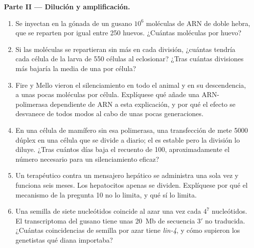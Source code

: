 \begin{problem}
\medskip
\noindent\textbf{Parte II --- Dilución y amplificación.}
\begin{enumerate}[resume]
  \item Se inyectan en la gónada de un gusano $10^{6}$ moléculas de ARN
        de doble hebra, que se reparten por igual entre \num{250}
        huevos. ¿Cuántas moléculas por huevo?
  \item Si las moléculas se repartieran sin más en cada división,
        ¿cuántas tendría cada célula de la larva de \num{550} células al
        eclosionar? ¿Tras cuántas divisiones más bajaría la media de una
        por célula?
  \item Fire y Mello vieron el silenciamiento en todo el animal y en su
        descendencia, a unas pocas moléculas por célula. Explíquese qué
        añade una ARN-polimerasa dependiente de ARN a esta explicación, y
        por qué el efecto se desvanece de todos modos al cabo de unas
        pocas generaciones.
  \item En una célula de mamífero sin esa polimerasa, una transfección
        de  mete \num{5000} dúplex en una célula que se divide a
        diario; el  es estable pero la división lo diluye. ¿Tras
        cuántos días baja el recuento de \num{100}, aproximadamente el
        número necesario para un silenciamiento eficaz?
  \item Un  terapéutico contra un mensajero hepático se administra
        una sola vez y funciona seis meses. Los hepatocitos apenas se
        dividen. Explíquese por qué el mecanismo de la pregunta 10 no lo
        limita, y qué sí lo limita.
  \item Una semilla de siete nucleótidos coincide al azar una vez cada
        $4^{7}$ nucleótidos. El transcriptoma del gusano tiene unas
        \qty{20}{Mb} de secuencia 3$'$ no traducida. ¿Cuántas
        coincidencias de semilla por azar tiene \emph{lin-4}, y cómo
        supieron los genetistas qué diana importaba?
\end{enumerate}


\end{problem}
